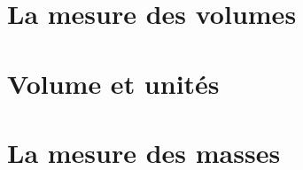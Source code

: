 \documentclass[12pt,a4paper]{article}
\date{}
\title{}
\begin{document}
	
	

\section{La mesure des volumes}









\section{Volume et unités}





%	
%	


\section{La mesure des masses}





\end{document}
